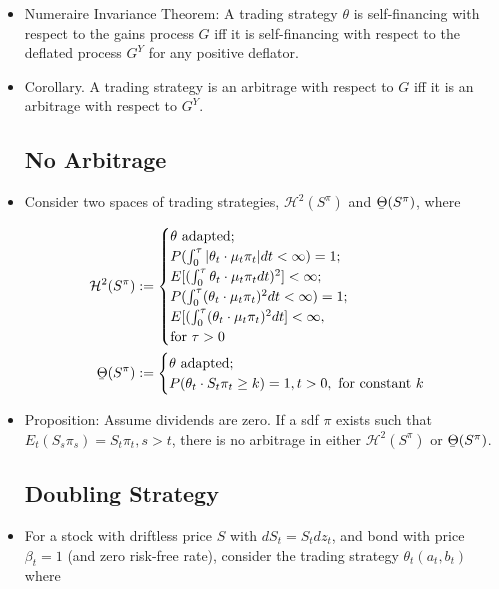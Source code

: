 \documentclass{article}
\newcommand{\ubar}[1]{\underaccent{\bar}{#1}}
\begin{document}
\begin{itemize}
\item Numeraire Invariance Theorem: A trading strategy $\theta$ is self-financing with respect to the gains process $G$ iff it is self-financing with respect to the deflated process $G^Y$ for any positive deflator.

\item Corollary. A trading strategy is an arbitrage with respect to $G$ iff it is an arbitrage with respect to $G^Y$.

\subsection*{No Arbitrage}

\item Consider two spaces of trading strategies, $\mathcal{H}^2(S^\pi)$ and $\ubar{\Theta}(S^{\pi})$, where

\begin{align*}
\mathcal{H}^2(S^\pi) 
&:= 
\begin{cases} 
\theta \text{ adapted};\\
P(\int_0^\tau | \theta_t \cdot \mu_t \pi_t | dt < \infty ) = 1;\\
E[(\int_0^\tau \theta_t \cdot \mu_t \pi_t dt)^2] < \infty; \\
P(\int_0^\tau ( \theta_t \cdot \mu_t \pi_t )^2 dt < \infty ) = 1;\\
E[(\int_0^\tau (\theta_t \cdot \mu_t \pi_t )^2 dt] < \infty,\\
\text{for }\tau >0  
\end{cases}\\
\ubar{\Theta}(S^{\pi}) 
&:= 
\begin{cases}
\theta \text{ adapted};\\
P(\theta_t \cdot S_t \pi_t \ge k) = 1, t >0, \text{ for constant } k\\
\end{cases}
\end{align*}

\item Proposition: Assume dividends are zero. If a sdf $\pi$ exists such that $E_t (S_s \pi_s) = S_t \pi_t, s>t$, there is no arbitrage in either $\mathcal{H}^2(S^\pi)$ or $\ubar{\Theta}(S^{\pi})$.

\subsection*{Doubling Strategy}

\item For a stock with driftless price $S$ with $dS_t = S_t dz_t$, and bond with price $\beta_t = 1$ (and zero risk-free rate), consider the trading strategy $\theta_t ( a_t, b_t)$ where


\end{itemize}
\end{document}
